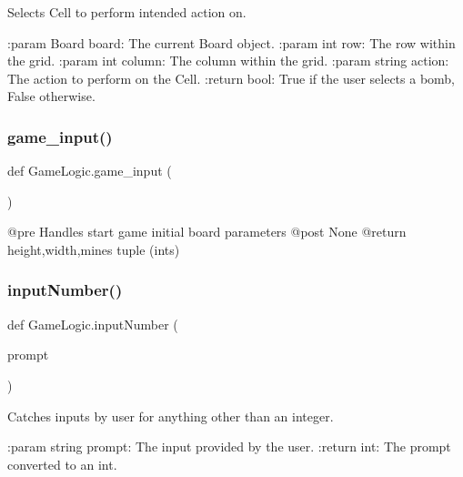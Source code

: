\begin{DoxyVerb}Selects Cell to perform intended action on.

:param Board board: The current Board object.
:param int row: The row within the grid.
:param int column: The column within the grid.
:param string action: The action to perform on the Cell.
:return bool: True if the user selects a bomb, False otherwise.
\end{DoxyVerb}
 \mbox{\label{namespace_game_logic_a4476538b080b2e54e2cf920d47385884}} 
\subsubsection{\texorpdfstring{game\+\_\+input()}{game\_input()}}
{\footnotesize\ttfamily def Game\+Logic.\+game\+\_\+input (\begin{DoxyParamCaption}{ }\end{DoxyParamCaption})}

\begin{DoxyVerb}@pre Handles start game initial board parameters
@post None
@return height,width,mines tuple (ints)
\end{DoxyVerb}
 \mbox{\label{namespace_game_logic_a9e9b9869e1330923fbe2a0cb04b6c50d}} 
\subsubsection{\texorpdfstring{input\+Number()}{inputNumber()}}
{\footnotesize\ttfamily def Game\+Logic.\+input\+Number (\begin{DoxyParamCaption}\item[{}]{prompt }\end{DoxyParamCaption})}

\begin{DoxyVerb}Catches inputs by user for anything other than an integer.

:param string prompt: The input provided by the user.
:return int: The prompt converted to an int.
\end{DoxyVerb}
 \mbox{\label{namespace_game_logic_aa208d35c45f200a28a8503ad891fd391}} 
